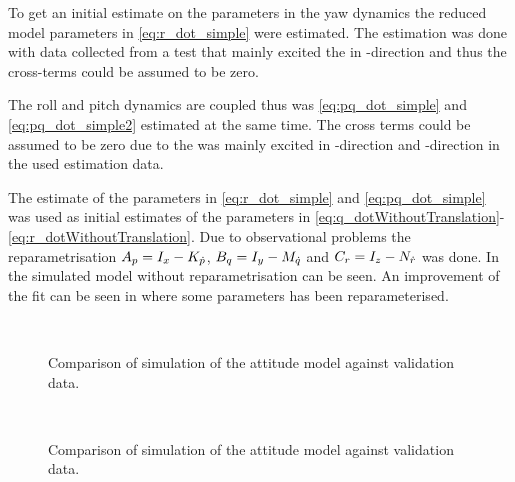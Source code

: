 To get an initial estimate on the parameters in the yaw dynamics the reduced model parameters in \eqref{eq:r_dot_simple}
were estimated. The estimation was done with data collected from a test that mainly excited the \abbrROV in \yawAngle-direction and thus the cross-terms could be assumed to be zero.

The roll and pitch dynamics are coupled thus was \eqref{eq:pq_dot_simple} and \eqref{eq:pq_dot_simple2} estimated at the same time.
The cross terms could be assumed to be zero due to the \abbrROV was mainly excited in \rollAngle-direction and \pitchAngle-direction in the used estimation data.

The estimate of the parameters in \eqref{eq:r_dot_simple} and \eqref{eq:pq_dot_simple} was used as initial estimates of the parameters in \eqref{eq:q_dotWithoutTranslation}-\eqref{eq:r_dotWithoutTranslation}. Due to observational problems the reparametrisation $A_p = I_{x} - K_{\dot{p}}$, $B_q = I_{y} - M_{\dot{q}}$ and $C_r = I_{z} - N_{\dot{r}}$ was done. In  the simulated model without reparametrisation can be seen. An improvement of the fit can be seen in  where some parameters has been reparameterised.
\begin{figure}[tbp]
  \centering
  \qquad
  \\
  \caption{\label{fig:velocityCompare}%
    Comparison of simulation of the attitude model against validation data.}
\end{figure}

\begin{figure}[tbp]
  \centering
  \qquad
  \\
  \caption{\label{fig:velocityCompareCong}%
    Comparison of simulation of the attitude model against validation data.}
\end{figure}
